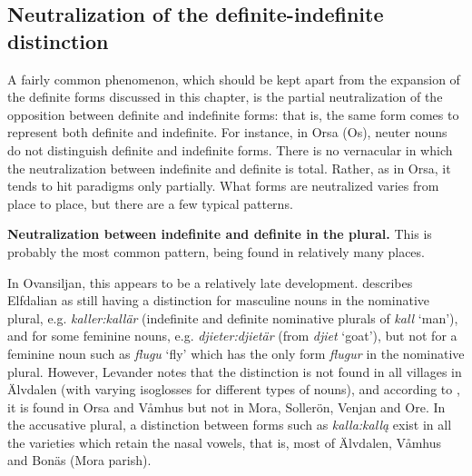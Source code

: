 \subsection{\rmfamily Neutralization of the definite-indefinite distinction}
\label{bkm:Ref114304507}
\begin{styleBodyTextFirst}
A fairly common phenomenon, which should be kept apart from the expansion of the definite forms discussed in this chapter, is the partial neutralization of the opposition between definite and indefinite forms: that is, the same form comes to represent both definite and indefinite. For instance, in Orsa (Os), neuter nouns do not distinguish definite and indefinite forms. There is no vernacular in which the neutralization between indefinite and definite is total. Rather, as in Orsa, it tends to hit paradigms only partially. What forms are neutralized varies from place to place, but there are a few typical patterns.

\end{styleBodyTextFirst}

\begin{styleBodytextC}
\textbf{Neutralization between indefinite and definite in the plural.} This is probably the most common pattern, being found in relatively many places. 

\end{styleBodytextC}

\begin{styleBodytextC}
In Ovansiljan, this appears to be a relatively late development. \citet{Levander1909} describes Elfdalian as still having a distinction for masculine nouns in the nominative plural, e.g. \textit{kaller:kallär }(indefinite and definite nominative plurals of \textit{kall }‘man’), and for some feminine nouns, e.g. \textit{djieter:djietär} (from \textit{djiet} ‘goat’), but not for a feminine noun such as \textit{flugu }‘fly’ which has the only form \textit{flugur} in the nominative plural. However, Levander notes that the distinction is not found in all villages in Älvdalen (with varying isoglosses for different types of nouns), and according to \citet[170]{Levander1928}, it is found in Orsa and Våmhus but not in Mora, Sollerön, Venjan and Ore. In the accusative plural, a distinction between forms such as \textit{kalla:kallą }exist in all the varieties which retain the nasal vowels, that is, most of Älvdalen, Våmhus and Bonäs (Mora parish). 

\end{styleBodytextC}

